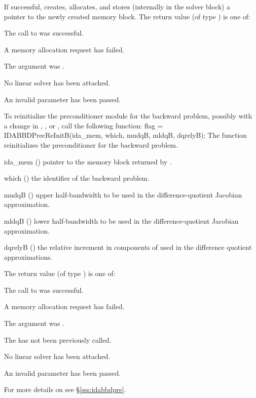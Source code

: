 {
  If successful,  creates, allocates, and stores (internally
  in the {\idas} solver block) a pointer to the newly created 
  {\idabbdpre} memory block.
  The return value  (of type ) is one of:
  \begin{args}
  \item[\Id{IDASPILS\_SUCCESS}]
    The call to  was successful.
  \item[\Id{IDASPILS\_MEM\_FAIL}]
    A memory allocation request has failed.
  \item[\Id{IDASPILS\_MEM\_NULL}]
    The  argument was .
  \item[\Id{IDASPILS\_LMEM\_NULL}]
    No linear solver has been attached.
  \item[\Id{IDASPILS\_ILL\_INPUT}]
    An invalid parameter has been passed.
  \end{args}
}
{}
To reinitialize the {\idabbdpre} preconditioner module for the backward problem,
possibly with a change in , , or , call the
following function:
{
  flag = IDABBDPrecReInitB(ida\_mem, which, mudqB, mldqB, dqrelyB);
}
{
  The function  reinitializes the {\idabbdpre} preconditioner
  for the backward problem.
}
{
  \begin{args}
  \item[ida\_mem] ()
    pointer to the {\idas} memory block returned by .
  \item[which] ()
    the identifier of the backward problem.
  \item[mudqB] ()
    upper half-bandwidth to be used in the difference-quotient Jacobian approximation.
  \item[mldqB] ()
    lower half-bandwidth to be used in the difference-quotient Jacobian approximation.
  \item[dqrelyB] ()
    the relative increment in components of  used in the difference quotient
    approximations.
  \end{args}
}
{
  The return value  (of type ) is one of:
  \begin{args}
  \item[\Id{IDASPILS\_SUCCESS}]
    The call to  was successful.
  \item[\Id{IDASPILS\_MEM\_FAIL}]
    A memory allocation request has failed.
  \item[\Id{IDASPILS\_MEM\_NULL}]
    The  argument was .
  \item[\Id{IDASPILS\_PMEM\_NULL}]
    The  has not been previously called.
  \item[\Id{IDASPILS\_LMEM\_NULL}]
    No linear solver has been attached.
  \item[\Id{IDASPILS\_ILL\_INPUT}]
    An invalid parameter has been passed.
  \end{args}
}
{}
For more details on {\idabbdpre} see \S\ref{sss:idabbdpre}.

